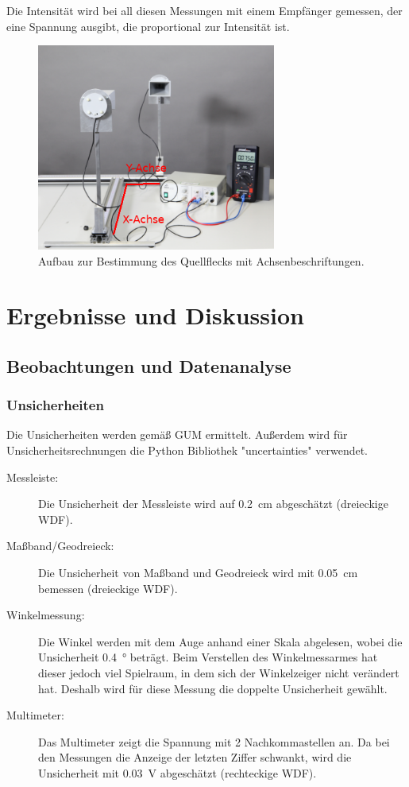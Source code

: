 \documentclass[
	a4paper,
	12pt,
	pagesize,
	ngerman
]{scrartcl}
\begin{document}
	Die Intensität wird bei all diesen Messungen mit einem Empfänger gemessen, der eine Spannung ausgibt, die proportional zur Intensität ist.
	
	\begin{figure}[H] 
		\includegraphics[width=0.7\textwidth]{MikrowellenMitAchsen}
		\centering
		\caption{Aufbau zur Bestimmung des Quellflecks mit Achsenbeschriftungen.\cite{Geometrie}}
		\label{fig_mikrowellenmitachsen}
		\centering
	\end{figure}
	
	\section{Ergebnisse und Diskussion}
	\subsection{Beobachtungen und Datenanalyse}
	\subsubsection{Unsicherheiten}
	Die Unsicherheiten werden gemäß GUM ermittelt. 
	Außerdem wird für Unsicherheitsrechnungen die Python Bibliothek "uncertainties" verwendet.
	\begin{description}
		\item[Messleiste:] Die Unsicherheit der Messleiste wird auf \SI{0,2}{cm} abgeschätzt (dreieckige WDF).
		\item[Maßband/Geodreieck:] Die Unsicherheit von Maßband und Geodreieck wird mit \SI{0,05}{cm} bemessen (dreieckige WDF).
		\item[Winkelmessung:]  Die Winkel werden mit dem Auge anhand einer Skala abgelesen, wobei die Unsicherheit \SI{0,4}{\degree} beträgt. Beim Verstellen des Winkelmessarmes hat dieser jedoch viel Spielraum, in dem sich der Winkelzeiger nicht verändert hat. Deshalb wird für diese Messung die doppelte Unsicherheit gewählt.
		\item[Multimeter:] Das Multimeter zeigt die Spannung mit 2 Nachkommastellen an. Da bei den Messungen die Anzeige der letzten Ziffer schwankt, wird die Unsicherheit mit \SI{0,03}{V} abgeschätzt (rechteckige WDF).
	\end{description}
\end{document}
